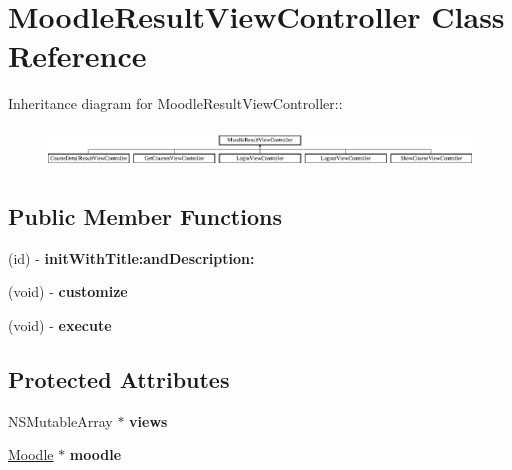 \hypertarget{interface_moodle_result_view_controller}{
\section{MoodleResultViewController Class Reference}
\label{interface_moodle_result_view_controller}
}
Inheritance diagram for MoodleResultViewController::\begin{figure}[H]
\begin{center}
\leavevmode
\includegraphics[height=1.06161cm]{interface_moodle_result_view_controller}
\end{center}
\end{figure}
\subsection*{Public Member Functions}
\begin{DoxyCompactItemize}
\item 
\hypertarget{interface_moodle_result_view_controller_a48bfefaa61beef799e134d57c055a840}{
(id) -\/ {\bfseries initWithTitle:andDescription:}}
\label{interface_moodle_result_view_controller_a48bfefaa61beef799e134d57c055a840}

\item 
\hypertarget{interface_moodle_result_view_controller_afaa8708480d544187d9b9b9b60c3db2c}{
(void) -\/ {\bfseries customize}}
\label{interface_moodle_result_view_controller_afaa8708480d544187d9b9b9b60c3db2c}

\item 
\hypertarget{interface_moodle_result_view_controller_a1ff8f48d30b1a07da3c09ce6342b1215}{
(void) -\/ {\bfseries execute}}
\label{interface_moodle_result_view_controller_a1ff8f48d30b1a07da3c09ce6342b1215}

\end{DoxyCompactItemize}
\subsection*{Protected Attributes}
\begin{DoxyCompactItemize}
\item 
\hypertarget{interface_moodle_result_view_controller_ae922da83358aa7098b66a68b1112bb90}{
NSMutableArray $\ast$ {\bfseries views}}
\label{interface_moodle_result_view_controller_ae922da83358aa7098b66a68b1112bb90}

\item 
\hypertarget{interface_moodle_result_view_controller_a6c8bc2101e2d0bf34d5339573f59277c}{
\hyperlink{interface_moodle}{Moodle} $\ast$ {\bfseries moodle}}
\label{interface_moodle_result_view_controller_a6c8bc2101e2d0bf34d5339573f59277c}

\end{DoxyCompactItemize}
